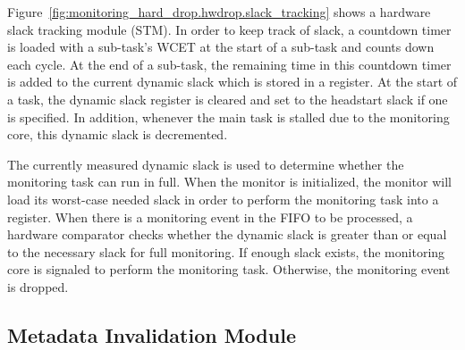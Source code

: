 Figure~\ref{fig:monitoring_hard_drop.hwdrop.slack_tracking} shows a hardware slack tracking module
(STM). In order to keep track of slack, a countdown timer is loaded with a
sub-task's WCET at the start of a sub-task and counts down each cycle. At the
end of a sub-task, the remaining time in this countdown timer is added to the
current dynamic slack which is stored in a register. At the start of a task,
the dynamic slack register is cleared and set to the headstart slack if one is
specified.  In addition, whenever the main task is stalled due to the
monitoring core, this dynamic slack is decremented.

The currently measured dynamic slack is used to determine whether the
monitoring task can run in full. When the monitor is initialized, the monitor
will load its worst-case needed slack in order to perform the monitoring task
into a register. When there is a monitoring event in the FIFO to be processed,
a hardware comparator checks whether the dynamic slack is greater than or equal
to the necessary slack for full monitoring. If enough slack exists, the
monitoring core is signaled to perform the monitoring task. Otherwise, the
monitoring event is dropped.

\subsection{Metadata Invalidation Module}
\label{sec:monitoring_hard_drop.hwdrop.drop}

